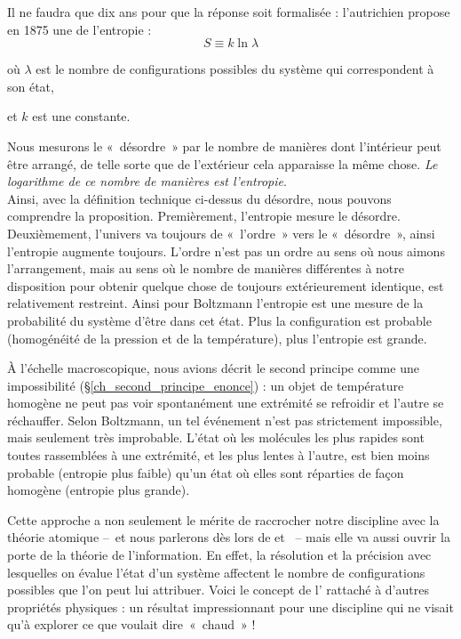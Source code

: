 		Il ne faudra que dix ans pour que la réponse soit formalisée : l’autrichien  propose en 1875 une  de l’entropie :
			\begin{equation}
				S \equiv k \ln \lambda
			\end{equation}
			\begin{equationterms}
				\item où \tab $\lambda$ \tab est le nombre de configurations possibles du système qui correspondent à son état, 
				\item et \tab $k$ \tab est une constante.
			\end{equationterms}
		
		Nous mesurons le «~dés\-or\-dre~» par le nombre de manières dont l’intérieur peut être arrangé, de telle sorte que de l’extérieur cela apparaisse la même chose. \emph{Le logarithme de ce  nombre de manières est l’entropie}.\\
Ainsi, avec la définition technique ci-dessus du désordre, nous pouvons comprendre la proposition. Premièrement, l’entropie mesure le désordre. Deuxièmement, l’univers va toujours de «~l’ordre~» vers le «~désordre~», ainsi l’entropie augmente toujours. L’ordre n’est pas un ordre au sens où nous aimons l’arrangement, mais au sens où le nombre de manières différentes à notre disposition pour obtenir quelque chose de toujours extérieurement identique, est relativement restreint. 
		Ainsi pour Boltzmann l’entropie est une mesure de la probabilité du système d’être dans cet état. Plus la configuration est probable (homogénéité de la pression et de la température), plus l’entropie est grande. 
		
		À l’échelle macroscopique, nous avions décrit le second principe comme une impossibilité (\S\ref{ch_second_principe_enonce}) : un objet de température homogène ne peut pas voir spontanément une extrémité se refroidir et l’autre se réchauffer. Selon Boltzmann, un tel événement n’est pas strictement impossible, mais seulement très improbable. L’état où les molécules les plus rapides sont toutes rassemblées à une extrémité, et les plus lentes à l’autre, est bien moins probable (entropie plus faible) qu’un état où elles sont réparties de façon homogène (entropie plus grande).
		
		Cette approche a non seulement le mérite de raccrocher notre discipline avec la théorie atomique --\ et nous parlerons dès lors de  et \ -- mais elle va aussi ouvrir la porte de la théorie de l’information. En effet, la résolution et la précision avec lesquelles on évalue l’état d’un système affectent le nombre de configurations possibles que l’on peut lui attribuer. Voici le concept de l’ rattaché à d’autres propriétés physiques : un résultat impressionnant pour une discipline qui ne visait qu’à explorer ce que voulait dire~«~chaud~» !
		
